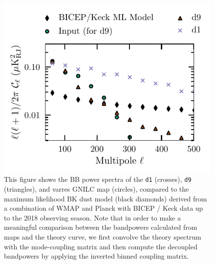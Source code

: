 \documentclass[twocolumn]{aastex631}
\newcommand{\done}{{\tt d1}}
\newcommand{\dnine}{{\tt d9}}
\begin{document}
\begin{figure}[ht]
    \centering
    \includegraphics{paper_BK_patch.pdf}
    \caption{This figure shows the BB power spectra of the \done{} (crosses), \dnine{} (triangles), and varres GNILC map (circles), compared to the maximum likelihood BK dust model (black diamonds) derived from a combination of WMAP and Planck with BICEP / Keck data up to the 2018 observing season. Note that in order to make a meaningful comparison between the bandpowers calculated from maps and the theory curve, we first convolve the theory spectrum with the mode-coupling matrix and then compute the decoupled bandpowers by applying the inverted binned coupling matrix.}
    \label{fig:d1d9_bkpatch}
\end{figure}
\end{document}

